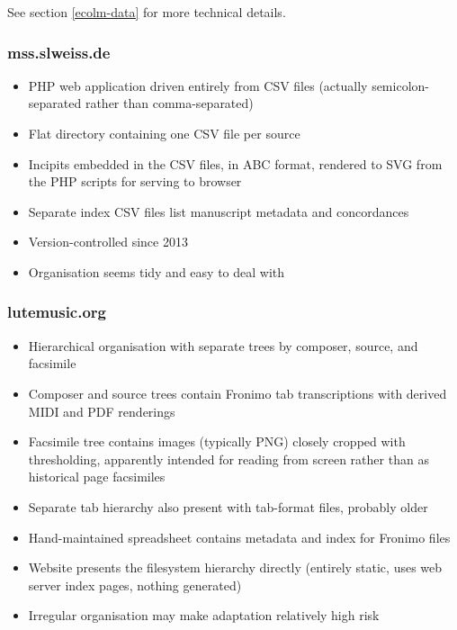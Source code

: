 \documentclass[sigconf]{acmart}
\begin{document}
\begin{sloppypar}
  See section \ref{ecolm-data} for more technical details.

  \subsubsection{mss.slweiss.de}

  \begin{itemize}
  \item PHP web application driven entirely from CSV files (actually
    semicolon-separated rather than comma-separated)
  \item Flat directory containing one CSV file per source
  \item Incipits embedded in the CSV files, in ABC format, rendered to
    SVG from the PHP scripts for serving to browser
  \item Separate index CSV files list manuscript metadata and
    concordances
  \item Version-controlled since 2013
  \item Organisation seems tidy and easy to deal with
  \end{itemize}
  
  \subsubsection{lutemusic.org}

  \begin{itemize}
  \item Hierarchical organisation with separate trees by composer,
    source, and facsimile
  \item Composer and source trees contain Fronimo tab transcriptions
    with derived MIDI and PDF renderings
  \item Facsimile tree contains images (typically PNG) closely cropped
    with thresholding, apparently intended for reading from screen
    rather than as historical page facsimiles
  \item Separate tab hierarchy also present with tab-format files,
    probably older
  \item Hand-maintained spreadsheet contains metadata and index for
    Fronimo files
  \item Website presents the filesystem hierarchy directly (entirely
    static, uses web server index pages, nothing generated)
  \item Irregular organisation may make adaptation relatively high
    risk
  \end{itemize}
    

\end{sloppypar}
\end{document}

